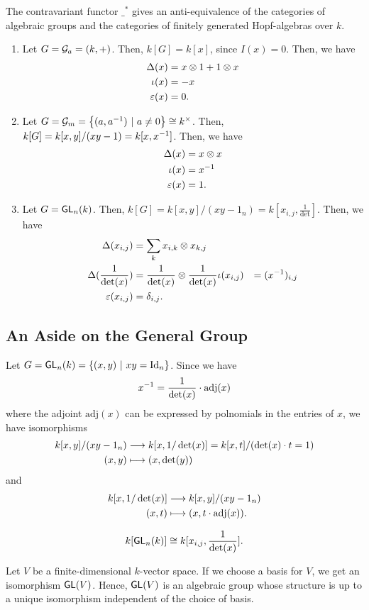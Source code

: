 \begin{theorem}
	The contravariant functor $\_^*$ gives an anti-equivalence of the categories of algebraic groups and the categories of finitely generated Hopf-algebras over $k$.
\end{theorem}

\begin{example}
\begin{enumerate}
	\item Let $G = \mathcal{G}_a = (k,+)$. Then, $k[G] = k[x]$, since $I(x) = 0$. Then, we have
	\begin{align*}
	\Delta(x) &= x \otimes 1 + 1 \otimes x\\
	\iota(x) &= -x\\
	\varepsilon(x) &= 0.
	\end{align*}
	\item Let $G = \mathcal{G}_m = \left\lbrace(a, a^{-1}) ~ | ~ a \neq 0\right\rbrace \overset{}{\cong} k^\times$. Then, $k[G] = k[x,y]/(xy - 1) = k[x,x^{-1}]$. Then, we have
	\begin{align*}
	\Delta(x) &= x \otimes x\\
	\iota(x) &= x^{-1}\\
	\varepsilon(x) &= 1.
	\end{align*}
	\item Let $G = \textsf{GL}_n(k) $. Then, $k[G] = k[x,y]/(xy - 1_n) = k[x_{i,j}, \frac{1}{\det}]$. Then, we have
	\begin{align*}
	\Delta(x_{i,j}) &= \sum_{k}x_{i,k} \otimes x_{k,j} \\
	\Delta(\frac{1}{\det(x)}) &= \frac{1}{\det(x)} \otimes \frac{1}{\det(x)}
	\iota(x_{i,j}) &= (x^{-1})_{i,j}\\
	\varepsilon(x_{i,j}) &= \delta_{i,j}.
	\end{align*}
\end{enumerate}
\end{example}

\subsection{An Aside on the General Group}
Let $G = \textsf{GL}_n(k) = \left\lbrace(x,y) ~ | ~ xy = \text{Id}_{n}\right\rbrace$. Since we have
\[ x^{-1} = \frac{1}{\det(x)} \cdot \mathrm{adj}(x) \]
where the adjoint $\mathrm{adj}(x)$ can be expressed by polnomials in the entries of $x$, we have isomorphisms
\begin{align*}
k[x,y] / (xy - 1_n) &\overset{}{\longrightarrow} k[x, 1/ \det(x)] = k[x,t] / (\det(x)\cdot t = 1)\\
(x,y) & \longmapsto (x, \det(y))
\end{align*}
and
\begin{align*}
 k[x, 1/ \det(x)] &\overset{}{\longrightarrow} k[x,y] / (xy - 1_n)\\
(x,t) & \longmapsto (x, t \cdot \mathrm{adj}(x)).
\end{align*}
\begin{lemma}
	\[k[\textsf{GL}_n(k)] \overset{}{\cong} k[x_{i,j}, \frac{1}{\det(x)}].\]
\end{lemma}

\begin{lemma}
	Let $V$ be a finite-dimensional $k$-vector space. If we choose a basis for $V$, we get an isomorphism $\textsf{GL}(V)$. Hence, $\textsf{GL}(V)$ is an algebraic group whose structure is up to a unique isomorphism independent of the choice of basis.
\end{lemma}
